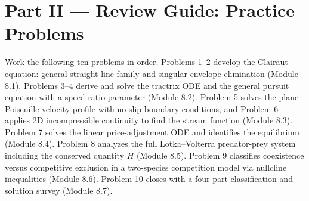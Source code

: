 \clearpage
{}
{}
\section*{Part II --- Review Guide: Practice Problems}

Work the following ten problems in order. Problems 1--2 develop the Clairaut
equation: general straight-line family and singular envelope elimination
(Module 8.1). Problems 3--4 derive and solve the tractrix ODE and the general
pursuit equation with a speed-ratio parameter (Module 8.2). Problem 5 solves
the plane Poiseuille velocity profile with no-slip boundary conditions, and
Problem 6 applies 2D incompressible continuity to find the stream function
(Module 8.3). Problem 7 solves the linear price-adjustment ODE and identifies
the equilibrium (Module 8.4). Problem 8 analyzes the full Lotka--Volterra
predator-prey system including the conserved quantity $H$ (Module 8.5).
Problem 9 classifies coexistence versus competitive exclusion in a two-species
competition model via nullcline inequalities (Module 8.6). Problem 10 closes
with a four-part classification and solution survey (Module 8.7).

